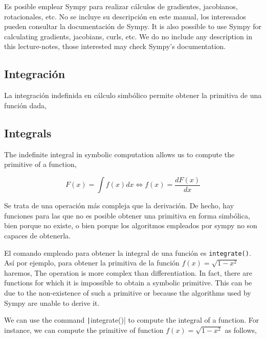 \begin{paracol}{2}
Es posible emplear Sympy para realizar cálculos de gradientes, jacobianos, rotacionales, etc. No se incluye su descripción en este manual, los interesados pueden consultar la documentación de Sympy.
\switchcolumn
It is also possible to use Sympy for calculating gradients, jacobians, curls, etc. We do no include any description in this lecture-notes, those interested may check Sympy's documentation.
\end{paracol}

\begin{paracol}{2}
\subsection{Integración} 
La integración indefinida en cálculo simbólico permite obtener la primitiva de una función dada,
\switchcolumn
\subsection{Integrals}
The indefinite integral in symbolic computation allows us to compute the primitive of a function,
\end{paracol}
\begin{equation*}
F(x) = \int f(x)dx  \Leftrightarrow f(x) = \frac{dF(x)}{dx}  
\end{equation*}
\begin{paracol}{2}
Se trata de una operación más compleja que la derivación. De hecho, hay funciones para las que no es posible obtener una primitiva en forma simbólica, bien porque no existe, o bien porque los algoritmos empleados por sympy no son capaces de obtenerla.

El comando empleado para obtener la integral de una función es \texttt{integrate()}. Así por ejemplo, para obtener la primitiva de la función $f(x) = \sqrt{1-x^2}$ haremos,
\switchcolumn
The operation is more complex than differentiation. In fact, there are functions for which it is impossible to obtain a symbolic primitive. This can be due to the non-existence of such a primitive or because the algorithms used by Sympy are unable to derive it.

We can use the command \texttt|integrate()| to compute the integral of a function. For instance, we can compute the primitive of function $f(x) = \sqrt{1-x^2}$ as follows,

\end{paracol}
